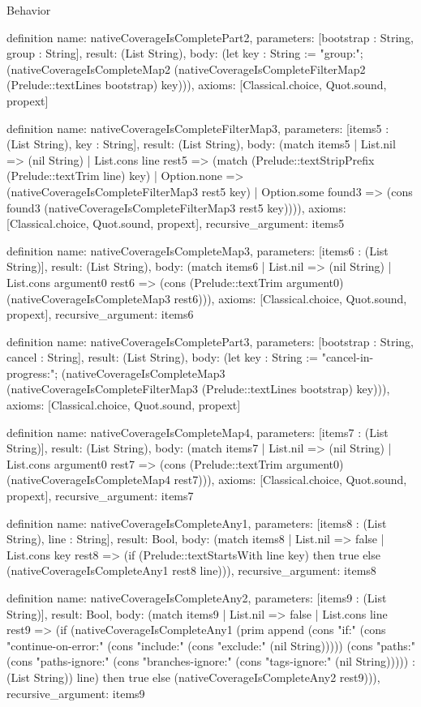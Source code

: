 \begin{lexlean}{Behavior}
\begin{semanticmodule}
definition{
  name: nativeCoverageIsCompletePart2,
  parameters: [bootstrap : String, group : String],
  result: (List String),
  body: (let key : String := "group:"; (nativeCoverageIsCompleteMap2 (nativeCoverageIsCompleteFilterMap2 (Prelude::textLines bootstrap) key))),
  axioms: [Classical.choice, Quot.sound, propext]
}

definition{
  name: nativeCoverageIsCompleteFilterMap3,
  parameters: [items5 : (List String), key : String],
  result: (List String),
  body: (match items5
    | List.nil => (nil String)
    | List.cons line rest5 => (match (Prelude::textStripPrefix (Prelude::textTrim line) key)
      | Option.none => (nativeCoverageIsCompleteFilterMap3 rest5 key)
      | Option.some found3 => (cons found3 (nativeCoverageIsCompleteFilterMap3 rest5 key)))),
  axioms: [Classical.choice, Quot.sound, propext],
  recursive_argument: items5
}

definition{
  name: nativeCoverageIsCompleteMap3,
  parameters: [items6 : (List String)],
  result: (List String),
  body: (match items6
    | List.nil => (nil String)
    | List.cons argument0 rest6 => (cons (Prelude::textTrim argument0) (nativeCoverageIsCompleteMap3 rest6))),
  axioms: [Classical.choice, Quot.sound, propext],
  recursive_argument: items6
}

definition{
  name: nativeCoverageIsCompletePart3,
  parameters: [bootstrap : String, cancel : String],
  result: (List String),
  body: (let key : String := "cancel-in-progress:"; (nativeCoverageIsCompleteMap3 (nativeCoverageIsCompleteFilterMap3 (Prelude::textLines bootstrap) key))),
  axioms: [Classical.choice, Quot.sound, propext]
}

definition{
  name: nativeCoverageIsCompleteMap4,
  parameters: [items7 : (List String)],
  result: (List String),
  body: (match items7
    | List.nil => (nil String)
    | List.cons argument0 rest7 => (cons (Prelude::textTrim argument0) (nativeCoverageIsCompleteMap4 rest7))),
  axioms: [Classical.choice, Quot.sound, propext],
  recursive_argument: items7
}

definition{
  name: nativeCoverageIsCompleteAny1,
  parameters: [items8 : (List String), line : String],
  result: Bool,
  body: (match items8
    | List.nil => false
    | List.cons key rest8 => (if (Prelude::textStartsWith line key) then true else (nativeCoverageIsCompleteAny1 rest8 line))),
  recursive_argument: items8
}

definition{
  name: nativeCoverageIsCompleteAny2,
  parameters: [items9 : (List String)],
  result: Bool,
  body: (match items9
    | List.nil => false
    | List.cons line rest9 => (if (nativeCoverageIsCompleteAny1 (prim append (cons "if:" (cons "continue-on-error:" (cons "include:" (cons "exclude:" (nil String))))) (cons "paths:" (cons "paths-ignore:" (cons "branches-ignore:" (cons "tags-ignore:" (nil String))))) : (List String)) line) then true else (nativeCoverageIsCompleteAny2 rest9))),
  recursive_argument: items9
}


\end{semanticmodule}
\end{lexlean}
